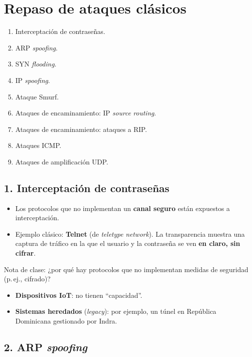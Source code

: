 \documentclass[11pt,a4paper]{report}
\begin{document}
\section{Repaso de ataques clásicos}
 
\begin{enumerate}
  \item Interceptación de contraseñas.
  \item ARP \emph{spoofing}.
  \item SYN \emph{flooding}.
  \item IP \emph{spoofing}.
  \item Ataque Smurf.
  \item Ataques de encaminamiento: IP \emph{source routing}.
  \item Ataques de encaminamiento: ataques a RIP.
  \item Ataques ICMP.
  \item Ataques de amplificación UDP.
\end{enumerate}
 
\subsection{1. Interceptación de contraseñas}
 
\begin{itemize}
  \item Los protocolos que no implementan un \textbf{canal seguro} están expuestos a interceptación.
  \item Ejemplo clásico: \textbf{Telnet} (de \emph{teletype network}). La transparencia muestra una captura de tráfico en la que el usuario y la contraseña se ven \textbf{en claro, sin cifrar}.
\end{itemize}
 
\begin{ejemplo}{Nota de clase: ¿por qué hay protocolos que no implementan medidas de seguridad (p.\,ej., cifrado)?}
\begin{itemize}
  \item \textbf{Dispositivos IoT}: no tienen ``capacidad''.
  \item \textbf{Sistemas heredados} (\emph{legacy}): por ejemplo, un túnel en República Dominicana gestionado por Indra.
\end{itemize}
\end{ejemplo}
 
\subsection{2. ARP \emph{spoofing}}
 
\end{document}
